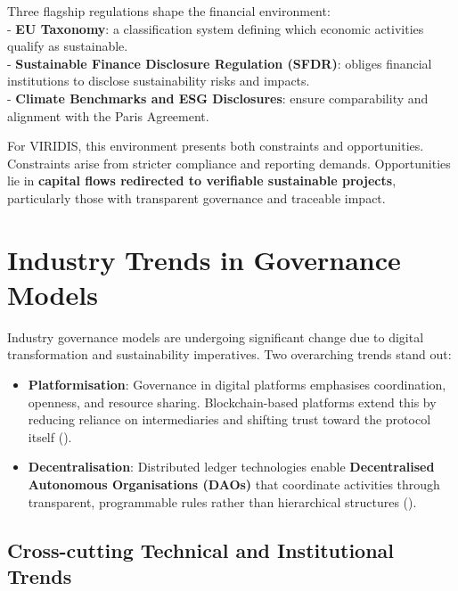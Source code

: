 \documentclass[
  english,
  12pt,
  oneside,
  open=any]{scrbook}
\providecommand{\tightlist}{%
  \setlength{\itemsep}{0pt}\setlength{\parskip}{0pt}}\usepackage{longtable,booktabs,array}
\begin{document}
Three flagship regulations shape the financial environment:\\
- \textbf{EU Taxonomy}: a classification system defining which economic
activities qualify as sustainable.\\
- \textbf{Sustainable Finance Disclosure Regulation (SFDR)}: obliges
financial institutions to disclose sustainability risks and impacts.\\
- \textbf{Climate Benchmarks and ESG Disclosures}: ensure comparability
and alignment with the Paris Agreement.

For VIRIDIS, this environment presents both constraints and
opportunities. Constraints arise from stricter compliance and reporting
demands. Opportunities lie in \textbf{capital flows redirected to
verifiable sustainable projects}, particularly those with transparent
governance and traceable impact.

\section{Industry Trends in Governance Models}\label{sec-trends}

Industry governance models are undergoing significant change due to
digital transformation and sustainability imperatives. Two overarching
trends stand out:

\begin{itemize}
\tightlist
\item
  \textbf{Platformisation}: Governance in digital platforms emphasises
  coordination, openness, and resource sharing. Blockchain-based
  platforms extend this by reducing reliance on intermediaries and
  shifting trust toward the protocol itself
  ().\\
\item
  \textbf{Decentralisation}: Distributed ledger technologies enable
  \textbf{Decentralised Autonomous Organisations (DAOs)} that coordinate
  activities through transparent, programmable rules rather than
  hierarchical structures ().
\end{itemize}

\subsection{Cross-cutting Technical and Institutional
Trends}\label{sec-trends-cross}
\end{document}
